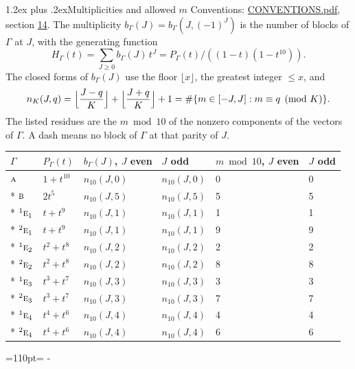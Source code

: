 \documentclass[10pt,a4paper]{article}
\makeatletter
\renewcommand\section{\@startsection{section}{1}{\z@}{-3ex plus -1ex minus -.2ex}%
  {1.2ex plus .2ex}{\normalfont\large\sffamily\bfseries\color{parttitle}}}
\newcommand{\needspace}[1]{\par\penalty-100\begingroup\dimen0=#1\relax\dimen2=\pagegoal
  \advance\dimen2-\pagetotal\ifdim\dimen0>\dimen2\relax\ifdim\dimen2>0pt\vfil\break\fi\fi
  \endgroup}
\numberwithin{equation}{section}
\newcommand{\irr}[1]{\text{\normalfont\scshape #1}}
\newcommand{\conjpair}[1]{{}^{#1}}
\makeatother
\begin{document}
\section{Multiplicities and allowed \texorpdfstring{$m$}{m}}\label{s:multiplicities}
Conventions: \href{../../CONVENTIONS.pdf}{CONVENTIONS.pdf}, section \href{../../CONVENTIONS.pdf\#conv.14}{14}.
\leavevmode\label{n:function.generating}\label{n:index.generating.variable}\label{n:function.generating.numerator}The multiplicity $b_\Gamma(J) = b_\Gamma(J, (-1)^J)$ is the number of blocks of $\Gamma$ at $J$, with the generating function
\begin{equation}\label{e:gf}H_\Gamma(t) = \sum_{J\ge0} b_\Gamma(J)\,t^J = P_\Gamma(t)/((1-t)(1-t^{10})).\end{equation}
\leavevmode\label{n:delimiter.floor}\label{n:local.floor.x}\label{n:function.count}\label{n:index.modulus.K}\label{n:index.residue}The closed forms of $b_\Gamma(J)$ use the floor $\lfloor x\rfloor$, the greatest integer $\le x$, and
\begin{equation}\label{e:count}n_K(J,q) = \Bigl\lfloor\frac{J-q}{K}\Bigr\rfloor + \Bigl\lfloor\frac{J+q}{K}\Bigr\rfloor + 1 = \#\{m\in[-J,J] : m\equiv q \pmod{K}\}.\end{equation}
\leavevmode\label{n:head.parity}The listed residues are the $m \bmod 10$ of the nonzero components of the vectors of $\Gamma$. A dash means no block of $\Gamma$ at that parity of $J$.
{\small\begin{longtable}{@{}llllll@{}}\toprule
$\Gamma$ & $P_\Gamma(t)$ & $b_\Gamma(J)$, $J$ even & $J$ odd & $m \bmod 10$, $J$ even & $J$ odd\\\midrule\endhead
\bottomrule\endfoot\endlastfoot
$\irr{a}$ & $1 + t^{10}$ & $n_{10}(J,0)$ & $n_{10}(J,0)$ & 0 & 0\\*
$\irr{b}$ & $2t^{5}$ & $n_{10}(J,5)$ & $n_{10}(J,5)$ & 5 & 5\\*
$\conjpair{1}\irr{e}_{1}$ & $t + t^{9}$ & $n_{10}(J,1)$ & $n_{10}(J,1)$ & 1 & 1\\*
$\conjpair{2}\irr{e}_{1}$ & $t + t^{9}$ & $n_{10}(J,1)$ & $n_{10}(J,1)$ & 9 & 9\\*
$\conjpair{1}\irr{e}_{2}$ & $t^{2} + t^{8}$ & $n_{10}(J,2)$ & $n_{10}(J,2)$ & 2 & 2\\*
$\conjpair{2}\irr{e}_{2}$ & $t^{2} + t^{8}$ & $n_{10}(J,2)$ & $n_{10}(J,2)$ & 8 & 8\\*
$\conjpair{1}\irr{e}_{3}$ & $t^{3} + t^{7}$ & $n_{10}(J,3)$ & $n_{10}(J,3)$ & 3 & 3\\*
$\conjpair{2}\irr{e}_{3}$ & $t^{3} + t^{7}$ & $n_{10}(J,3)$ & $n_{10}(J,3)$ & 7 & 7\\*
$\conjpair{1}\irr{e}_{4}$ & $t^{4} + t^{6}$ & $n_{10}(J,4)$ & $n_{10}(J,4)$ & 4 & 4\\*
$\conjpair{2}\irr{e}_{4}$ & $t^{4} + t^{6}$ & $n_{10}(J,4)$ & $n_{10}(J,4)$ & 6 & 6\\
\bottomrule\end{longtable}}
\needspace{110pt}
\end{document}
